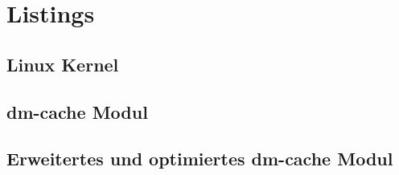 \section*{Listings}

\subsection*{Linux Kernel}



\newpage

\subsection*{dm-cache Modul}

\begin{minipage}{\textwidth}





\end{minipage}

\newpage

\subsection*{Erweitertes und optimiertes dm-cache Modul}


